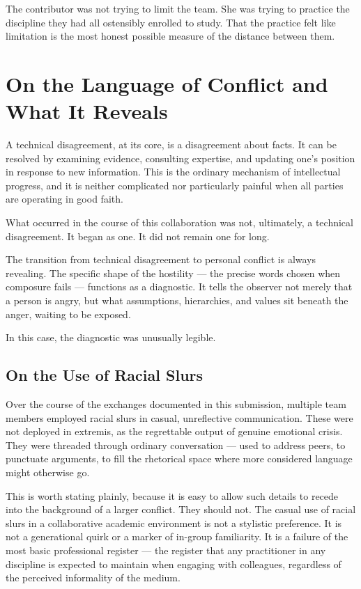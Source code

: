 \documentclass[11pt,a4paper]{book}
\begin{document}
The contributor was not trying to limit the team. She was trying to practice the discipline they had all ostensibly enrolled to study. That the practice felt like limitation is the most honest possible measure of the distance between them.

\section{On the Language of Conflict and What It Reveals}

A technical disagreement, at its core, is a disagreement about facts. It can be resolved by examining evidence, consulting expertise, and updating one's position in response to new information. This is the ordinary mechanism of intellectual progress, and it is neither complicated nor particularly painful when all parties are operating in good faith.

What occurred in the course of this collaboration was not, ultimately, a technical disagreement. It began as one. It did not remain one for long.

The transition from technical disagreement to personal conflict is always revealing. The specific shape of the hostility --- the precise words chosen when composure fails --- functions as a diagnostic. It tells the observer not merely that a person is angry, but what assumptions, hierarchies, and values sit beneath the anger, waiting to be exposed.

In this case, the diagnostic was unusually legible.

\subsection{On the Use of Racial Slurs}

Over the course of the exchanges documented in this submission, multiple team members employed racial slurs in casual, unreflective communication. These were not deployed in extremis, as the regrettable output of genuine emotional crisis. They were threaded through ordinary conversation --- used to address peers, to punctuate arguments, to fill the rhetorical space where more considered language might otherwise go.

This is worth stating plainly, because it is easy to allow such details to recede into the background of a larger conflict. They should not. The casual use of racial slurs in a collaborative academic environment is not a stylistic preference. It is not a generational quirk or a marker of in-group familiarity. It is a failure of the most basic professional register --- the register that any practitioner in any discipline is expected to maintain when engaging with colleagues, regardless of the perceived informality of the medium.
\end{document}
